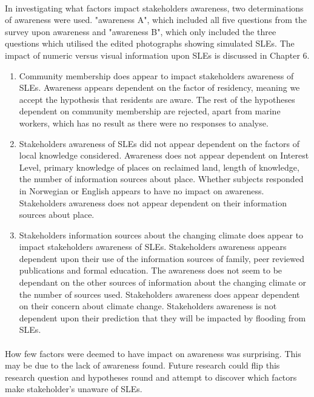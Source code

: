 \paragraph{}

In investigating what factors impact stakeholders awareness, two determinations of awareness were used. "awareness A", which included all five questions from the survey upon awareness and "awareness B", which only included the three questions which utilised the edited photographs showing simulated SLEs. The impact of numeric versus visual information upon SLEs is discussed in Chapter 6.
\begin{enumerate}
    \item Community membership does appear to impact stakeholders awareness of SLEs. Awareness appears dependent on the factor of residency, meaning we accept the hypothesis that residents are aware. The rest of the hypotheses dependent on community membership are rejected, apart from marine workers, which has no result as there were no responses to analyse.
  
    \item Stakeholders awareness of SLEs did not appear dependent on the factors of local knowledge considered. Awareness does not appear dependent on Interest Level, primary knowledge of places on reclaimed land, length of knowledge, the number of information sources about place. Whether subjects responded in Norwegian or English appears to have no impact on awareness. Stakeholders awareness does not appear dependent on their information sources about place. 

    \item  Stakeholders information sources about the changing climate does appear to impact stakeholders awareness of SLEs. Stakeholders awareness appears dependent upon their use of the information sources of family, peer reviewed publications and formal education. The awareness does not seem to be dependant on the other sources of information about the changing climate or the number of sources used. Stakeholders awareness does appear dependent on their concern about climate change. Stakeholders awareness is not dependent upon their prediction that they will be impacted by flooding from SLEs.
\end{enumerate}
\paragraph{}
How few factors were deemed to have impact on awareness was surprising. This may be due to the lack of awareness found.  Future research could flip this research question and hypotheses round and attempt to discover which factors make stakeholder's unaware of SLEs. 


